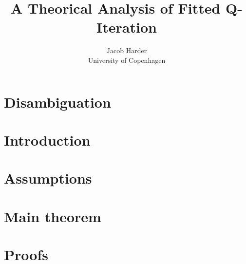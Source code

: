 \documentclass{article}
\title{A Theorical Analysis of Fitted Q-Iteration}
\author{Jacob Harder \\ University of Copenhagen}
\begin{document}
\maketitle

\section{Disambiguation}


\section{Introduction}


\section{Assumptions}


\section{Main theorem}


\section{Proofs}



\end{document}
